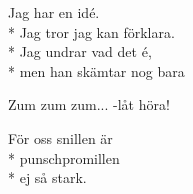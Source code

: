 \begin{SongText}
\begin{SongVerse}
    \end{SongVerse}
    \begin{SongVerse}
        Jag har en idé.\\*%
        Jag tror jag kan förklara.\\*%
        Jag undrar vad det é,\\*%
        men han skämtar nog bara
    \end{SongVerse}
    \begin{SongVerse}
        Zum zum zum... -låt höra!
    \end{SongVerse}
    \begin{SongVerse}
        För oss snillen är\\*%
        punschpromillen\\*%
        ej så stark.
    \end{SongVerse}
\end{SongText}